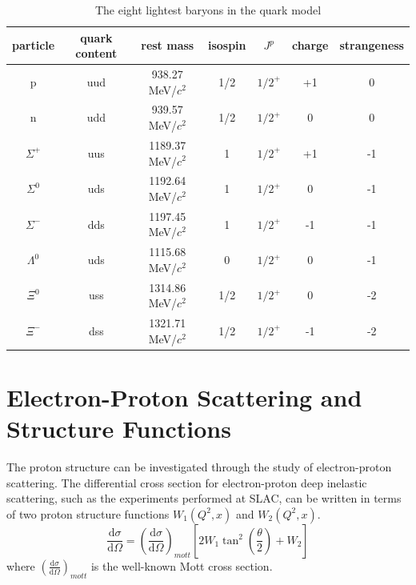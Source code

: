 \documentclass[letterpaper, abstract = on,listof=totoc, bibliography=totoc]{scrreprt}
\begin{document}
\begin{table}[h!]
\begin{center}
\begin{tabular}{|c|c|c|c|c|c|c|} \hline
particle & quark content & rest mass & isospin & $J^p$ & charge & strangeness \\
\hline
p			& uud & 938.27 MeV/$c^2$ 		& 1/2 & $1/2^+$ & +1 & 0  \\
n			& udd & 939.57 MeV/$c^2$		& 1/2 & $1/2^+$ & 0   & 0  \\
$\Sigma^+$	& uus & 1189.37 MeV/$c^2$		& 1    & $1/2^+$ & +1 & -1 \\
$\Sigma^0$	& uds & 1192.64 MeV/$c^2$		& 1    & $1/2^+$ & 0 & -1 \\
$\Sigma^-$	& dds & 1197.45 MeV/$c^2$		& 1    & $1/2^+$ & -1 & -1 \\
$\Lambda^0$	& uds & 1115.68 MeV/$c^2$		& 0    & $1/2^+$ & 0 & -1 \\
$\Xi^0$		& uss & 1314.86 MeV/$c^2$		& 1/2  & $1/2^+$ & 0 & -2 \\
$\Xi^-$		& dss & 1321.71 MeV/$c^2$		& 1/2  & $1/2^+$ & -1 & -2 \\
\hline
\end{tabular}
\caption{The eight lightest baryons in the quark model}
\label{tab:baryontable}
\end{center}
\end{table}



\section{Electron-Proton Scattering and Structure Functions}

The proton structure can be investigated through the study of electron-proton scattering. The differential cross section for electron-proton deep inelastic scattering, such as the experiments performed at SLAC, can be written in terms of two proton structure functions $W_1(Q^2, x)$ and $W_2(Q^2, x)$.
\begin{equation}
\frac{\text{d}\sigma}{\text{d}\Omega} = \left(\frac{\text{d}\sigma}{\text{d}\Omega}\right)_{mott}\left[2W_1\tan^2\left(\frac{\theta}{2}\right) + W_2\right]
\end{equation}
where $\left(\frac{\text{d}\sigma}{\text{d}\Omega}\right)_{mott}$ is the well-known Mott cross section.
\end{document}
